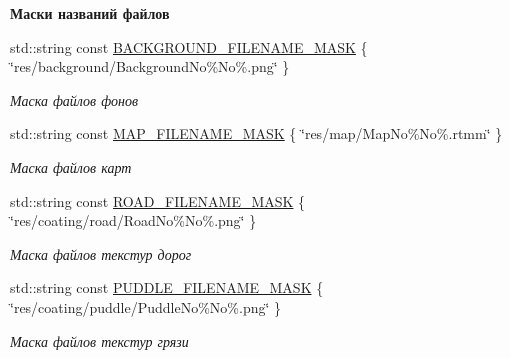 \begin{Indent}\textbf{ Маски названий файлов}\par
\begin{DoxyCompactItemize}
\item 
\mbox{\label{namespacertm_a100c48b48ca5735bfdf3d809fa5dae58}} 
std\+::string const \hyperlink{namespacertm_a100c48b48ca5735bfdf3d809fa5dae58}{B\+A\+C\+K\+G\+R\+O\+U\+N\+D\+\_\+\+F\+I\+L\+E\+N\+A\+M\+E\+\_\+\+M\+A\+SK} \{ \char`\"{}res/background/Background\+No\%No\%.png\char`\"{} \}
\begin{DoxyCompactList}\small\item\em Маска файлов фонов \end{DoxyCompactList}\item 
\mbox{\label{namespacertm_ae29fce52eae57c27a760b021b774ca4e}} 
std\+::string const \hyperlink{namespacertm_ae29fce52eae57c27a760b021b774ca4e}{M\+A\+P\+\_\+\+F\+I\+L\+E\+N\+A\+M\+E\+\_\+\+M\+A\+SK} \{ \char`\"{}res/map/Map\+No\%No\%.rtmm\char`\"{} \}
\begin{DoxyCompactList}\small\item\em Маска файлов карт \end{DoxyCompactList}\item 
\mbox{\label{namespacertm_acd3fb4c773d00c98945d16d14a03f380}} 
std\+::string const \hyperlink{namespacertm_acd3fb4c773d00c98945d16d14a03f380}{R\+O\+A\+D\+\_\+\+F\+I\+L\+E\+N\+A\+M\+E\+\_\+\+M\+A\+SK} \{ \char`\"{}res/coating/road/Road\+No\%No\%.png\char`\"{} \}
\begin{DoxyCompactList}\small\item\em Маска файлов текстур дорог \end{DoxyCompactList}\item 
\mbox{\label{namespacertm_a36bc7360b448af7ae9aee9731bc7193c}} 
std\+::string const \hyperlink{namespacertm_a36bc7360b448af7ae9aee9731bc7193c}{P\+U\+D\+D\+L\+E\+\_\+\+F\+I\+L\+E\+N\+A\+M\+E\+\_\+\+M\+A\+SK} \{ \char`\"{}res/coating/puddle/Puddle\+No\%No\%.png\char`\"{} \}
\begin{DoxyCompactList}\small\item\em Маска файлов текстур грязи \end{DoxyCompactList}\item 
\mbox{\label{namespacertm_aa9d61ca4243a3f2479f27c61535fcc9d}} 

\end{DoxyCompactItemize}
\end{Indent}
